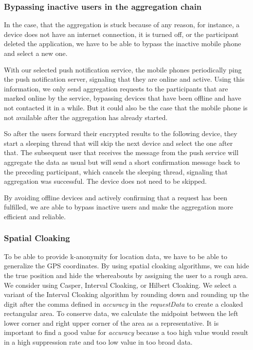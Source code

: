 \subsubsection{Bypassing inactive users in the aggregation chain}
In the case, that the aggregation is stuck because of any reason, for instance, a device does not have an internet connection, it is turned off, or the participant deleted the application, we have to be able to bypass the inactive mobile phone and select a new one.

With our selected push notification service, the mobile phones periodically ping the push notification server, signaling that they are online and active. Using this information, we only send aggregation requests to the participants that are marked online by the service, bypassing devices that have been offline and have not contacted it in a while. But it could also be the case that the mobile phone is not available after the aggregation has already started.

So after the users forward their encrypted results to the following device, they start a sleeping thread that will skip the next device and select the one after that. The subsequent user that receives the message from the push service will aggregate the data as usual but will send a short confirmation message back to the preceding participant, which cancels the sleeping thread, signaling that aggregation was successful. The device does not need to be skipped.

By avoiding offline devices and actively confirming that a request has been fulfilled, we are able to bypass inactive users and make the aggregation more efficient and reliable.

\subsubsection{Spatial Cloaking}
To be able to provide k-anonymity for location data, we have to be able to generalize the GPS coordinates. By using spatial cloaking algorithms, we can hide the true position and hide the whereabouts by assigning the user to a rough area. We consider using Casper, Interval Cloaking, or Hilbert Cloaking. We select a variant of the Interval Cloaking algorithm by rounding down and rounding up the digit after the comma defined in \textit{accuracy} in the \textit{requestData} to create a cloaked rectangular area. To conserve data, we calculate the midpoint between the left lower corner and right upper corner of the area as a representative. It is important to find a good value for \textit{accuracy} because a too high value would result in a high suppression rate and too low value in too broad data. 

